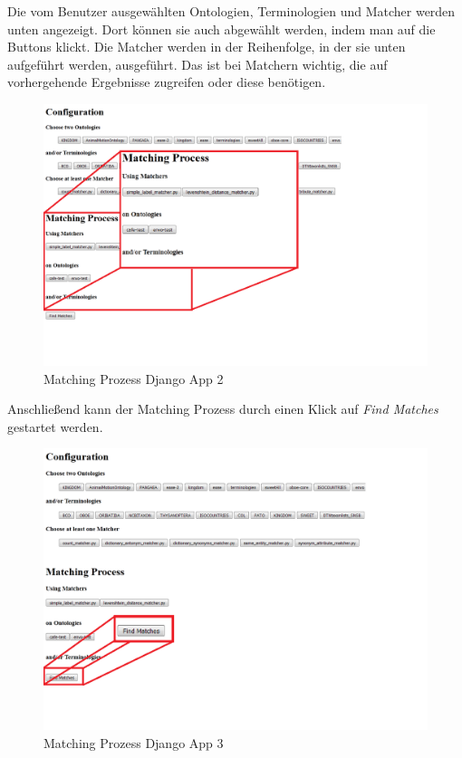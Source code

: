 		\pagebreak[4]
		Die vom Benutzer ausgewählten Ontologien, Terminologien und Matcher werden
		unten angezeigt.
		Dort können sie auch abgewählt werden, indem man auf die Buttons klickt. Die Matcher werden in der
		Reihenfolge, in der sie unten aufgeführt werden, ausgeführt. Das ist bei
		Matchern wichtig, die auf vorhergehende Ergebnisse zugreifen oder diese
		benötigen.
		\begin{figure}[h!]
		\centering
		\includegraphics[width=1.0\textwidth]{pics/SimpleOntologyMatcher-Process1.png}
		\caption{Matching Prozess Django App 2}
		\label{fig5}
		\end{figure}
		
		\pagebreak[4]
		Anschließend kann der Matching Prozess durch einen Klick auf \textit{Find
		Matches} gestartet werden.
		\begin{figure}[h!]
		\centering
		\includegraphics[width=1.0\textwidth]{pics/SimpleOntologyMatcher-Process2.png}
		\caption{Matching Prozess Django App 3}
		\label{fig6}
		\end{figure}
		
